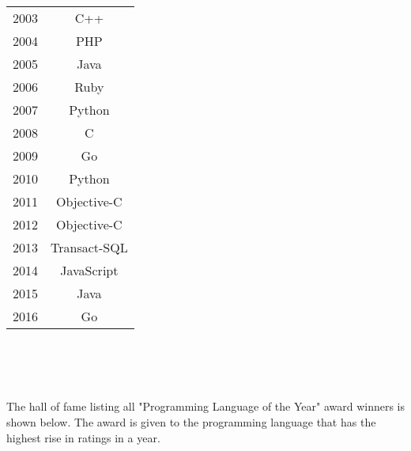\documentclass[a4paper, 12pt]{report}
\begin{document}
\begin{center}
\\
\begin{tabular}{||c|c||}
2003&C++\\ 2004&PHP \\2005&Java \\ 2006&Ruby\\  2007&Python\\ 2008&C\\ 2009&Go\\ 2010&Python \\2011&Objective-C\\ 2012&Objective-C\\ 2013&Transact-SQL\\ 2014&JavaScript \\2015 &Java \\ 2016&Go
\\      
\end{tabular}
\begin{center}
    \\
    \\
    \\
\end{center}
The hall of fame listing all "Programming Language of the Year" award winners is shown below. The award is given to the 
programming language that has the highest rise in ratings in a year. 
\end{center}
\end{document}
